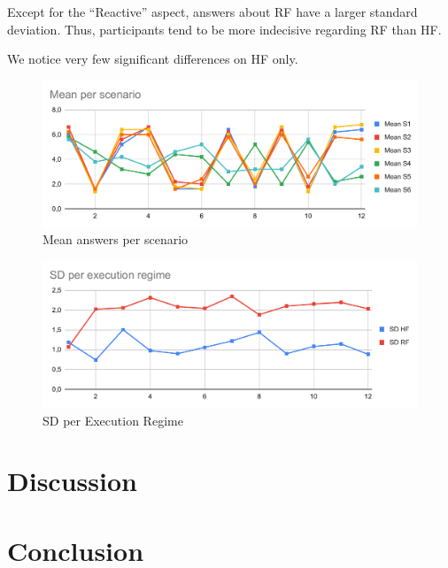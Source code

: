 Except for the ``Reactive'' aspect, answers about RF have a larger standard deviation. Thus, participants tend to be more indecisive regarding RF than HF.

We notice very few significant differences on HF only.

\begin{figure}
    \includegraphics[width=\linewidth]{images/Chapter5/Mean per scenario.pdf}
    \caption{Mean answers per scenario}
    \label{fig:mean_per_scenario}
\end{figure}

\begin{figure}
    \includegraphics[width=\linewidth]{images/Chapter5/SD per execution regime.pdf}
    \caption{SD per Execution Regime}
    \label{fig:sd_per_execution_regime}
\end{figure}


\section{Discussion}


\section{Conclusion}

